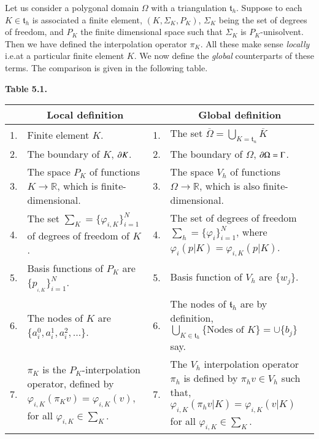 Let us consider a polygonal domain $\Omega$ with a triangulation
$\mathfrak{t}_{h}$. Suppose to each $K\in \mathfrak{t}_{h}$ is
associated a finite element, $(K,\Sigma_{K},P_{K})$, $\Sigma_{K}$
being the set of degrees of freedom, and $P_{K}$ the finite
dimensional space such that $\Sigma_{K}$ is $P_{K}$-unisolvent. Then
we have defined the interpolation operator $\pi_{K}$. All these make
sense {\em locally} i.e.\@ at a particular finite element $K$. We now
define the {\em global} counterparts of these terms. The comparison is
given in the following table.
\begin{center}
{\bf Table 5.1.}
\bigskip

\renewcommand{\arraystretch}{1.2}
\begin{tabular}{rp{4.2cm}|rp{4.5cm}}
\hline
 & \multicolumn{1}{c|}{Local definition}  && \multicolumn{1}{c}{Global
definition}\\ 
\hline
1. & Finite element $K$. & 1. & The set
$\overline{\Omega}=\bigcup\limits_{K=\mathfrak{t}_{n}}\overline{K}$\\
2. & The boundary of $K$, $\partial K$. & 2. & The boundary of $\Omega$, $\partial
\Omega=\Gamma$.\\
3. & The space $P_{K}$ of functions $K\to \mathbb{R}$, which is
finite-dimensional. & 3. & The space $V_{h}$ of functions $\Omega\to
\mathbb{R}$, which is also finite-dimensional.\\
4. & The set $\sum_{K}=\{\varphi_{i,K}\}^{N}_{i=1}$ of degrees of
freedom of $K$. & 4. & The set of degrees of freedom
$\sum_{h}=\{\varphi_{i}\}^{N}_{i=1}$, where
$\varphi_{i}(p|K)=\varphi_{i,K}(p|K)$.\\
5. & Basis functions of $P_{K}$ are $\{p_{_{i,K}}\}^{N}_{i=1}$. & 5. &
Basis function of $V_{h}$ are $\{w_{j}\}$.\\
6. & The nodes of $K$ are
$\{a_{i}^{0},a^{1}_{i},a^{2}_{i},\ldots\}$. & 6. & The nodes of
$\mathfrak{t}_{h}$ are by definition,
$\bigcup\limits_{K\in\mathfrak{t}_{h}}\{\text{Nodes of } K\}=\cup
\{b_{j}\}$ say. \\
7. & $\pi_{K}$ is the $P_{K}$-interpolation operator, defined by
$\varphi_{i,K}(\pi_{K}v)=\varphi_{i,K}(v)$, for all
$\varphi_{i,K}\in\sum_{K}$. & 7. & The $V_{h}$ interpolation operator
$\pi_{h}$ is defined by $\pi_{h}v\in V_{h}$ such that,
$\varphi_{i,K}(\pi_{h}v|K)=\varphi_{i,K}(v|K)$ for all
$\varphi_{i,K}\in\sum_{K}$.\\
\hline 
\end{tabular}
\end{center}\pageoriginale 


